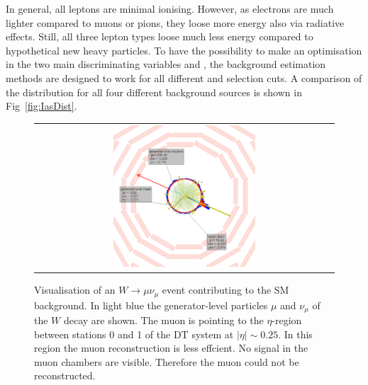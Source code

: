 In general, all leptons are minimal ionising.
However, as electrons are much lighter compared to muons or pions, they loose more energy also via radiative effects.
Still, all three lepton types loose much less energy compared to hypothetical new heavy particles.
To have the possibility to make an optimisation in the two main discriminating variables \pt and \ias, the background estimation methods are designed to work for all different \pt and \ias selection cuts.
A comparison of the \ias distribution for all four different background sources is shown in Fig~\ref{fig:IasDist}.
\begin{figure}[!tb]
  \centering 
  \vspace{25pt}
  \begin{tabular}{c}
    \includegraphics[width=0.49\textwidth]{figures/analysis/LostMuon_Lumi_357583_Event_142918834.png}
  \end{tabular}
  \caption{Visualisation of an $W\rightarrow \mu\nu_{\mu}$ event contributing to the SM background. 
           In light blue the generator-level particles $\mu$ and $\nu_{\mu}$ of the $W$ decay are shown. 
           The muon is pointing to the $\eta$-region between stations 0 and 1 of the DT system at $|\eta|\sim0.25$.
           In this region the muon reconstruction is less effcient. No signal in the muon chambers are visible. Therefore the  muon could not be reconstructed.}
  \label{fig:LostMuon}
\vspace{25pt}
\end{figure}

